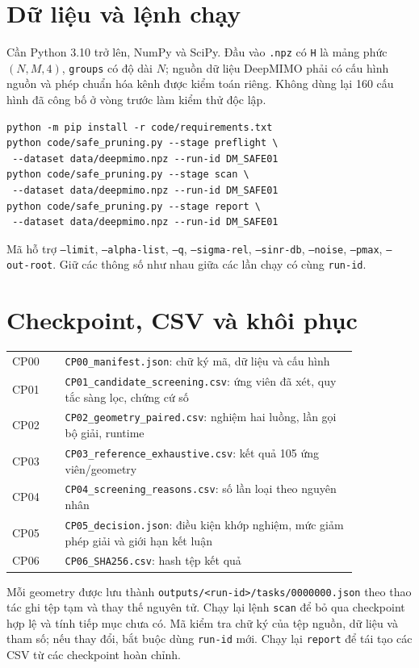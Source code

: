 \documentclass[12pt,onecolumn]{IEEEtran}
\begin{document}
\section{Dữ liệu và lệnh chạy}
Cần Python 3.10 trở lên, NumPy và SciPy. Đầu vào \texttt{.npz} có \texttt{H} là mảng phức $(N,M,4)$, \texttt{groups} có độ dài $N$; nguồn dữ liệu DeepMIMO phải có cấu hình nguồn và phép chuẩn hóa kênh được kiểm toán riêng. Không dùng lại 160 cấu hình đã công bố ở vòng trước làm kiểm thử độc lập.
\begin{verbatim}
python -m pip install -r code/requirements.txt
python code/safe_pruning.py --stage preflight \
 --dataset data/deepmimo.npz --run-id DM_SAFE01
python code/safe_pruning.py --stage scan \
 --dataset data/deepmimo.npz --run-id DM_SAFE01
python code/safe_pruning.py --stage report \
 --dataset data/deepmimo.npz --run-id DM_SAFE01
\end{verbatim}
Mã hỗ trợ \texttt{--limit}, \texttt{--alpha-list}, \texttt{--q}, \texttt{--sigma-rel}, \texttt{--sinr-db}, \texttt{--noise}, \texttt{--pmax}, \texttt{--out-root}. Giữ các thông số như nhau giữa các lần chạy có cùng \texttt{run-id}.
\section{Checkpoint, CSV và khôi phục}
\begin{center}\small\begin{tabular}{p{0.13\linewidth}p{0.72\linewidth}}\toprule
CP00 & \texttt{CP00\_manifest.json}: chữ ký mã, dữ liệu và cấu hình\\
CP01 & \texttt{CP01\_candidate\_screening.csv}: ứng viên đã xét, quy tắc sàng lọc, chứng cứ số\\
CP02 & \texttt{CP02\_geometry\_paired.csv}: nghiệm hai luồng, lần gọi bộ giải, runtime\\
CP03 & \texttt{CP03\_reference\_exhaustive.csv}: kết quả 105 ứng viên/geometry\\
CP04 & \texttt{CP04\_screening\_reasons.csv}: số lần loại theo nguyên nhân\\
CP05 & \texttt{CP05\_decision.json}: điều kiện khớp nghiệm, mức giảm phép giải và giới hạn kết luận\\
CP06 & \texttt{CP06\_SHA256.csv}: hash tệp kết quả\\\bottomrule\end{tabular}\end{center}
Mỗi geometry được lưu thành \texttt{outputs/<run-id>/tasks/0000000.json} theo thao tác ghi tệp tạm và thay thế nguyên tử. Chạy lại lệnh \texttt{scan} để bỏ qua checkpoint hợp lệ và tính tiếp mục chưa có. Mã kiểm tra chữ ký của tệp nguồn, dữ liệu và tham số; nếu thay đổi, bắt buộc dùng \texttt{run-id} mới. Chạy lại \texttt{report} để tái tạo các CSV từ các checkpoint hoàn chỉnh.
\end{document}
